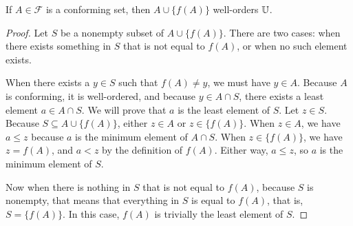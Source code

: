\documentclass[../../math.tex]{subfiles}
\begin{document}
\begin{lemma} \label{conforming_add_wo}
    If $A \in \mathcal F$ is a conforming set, then $A \cup \{f(A)\}$
    well-orders $\mathbb{U}$.
\end{lemma}
\begin{proof}
    Let $S$ be a nonempty subset of $A \cup \{f(A)\}$.  There are two cases:
    when there exists something in $S$ that is not equal to $f(A)$, or when no
    such element exists.

    When there exists a $y \in S$ such that $f(A) \neq y$, we must have $y \in
    A$.  Because $A$ is conforming, it is well-ordered, and because $y \in A
    \cap S$, there exists a least element $a \in A \cap S$.  We will prove that
    $a$ is the least element of $S$.  Let $z \in S$.  Because $S \subseteq A
    \cup \{f(A)\}$, either $z \in A$ or $z \in \{f(A)\}$.  When $z \in A$, we
    have $a \leq z$ because $a$ is the minimum element of $A \cap S$.  When $z
    \in \{f(A)\}$, we have $z = f(A)$, and $a < z$ by the definition of $f(A)$.
    Either way, $a \leq z$, so $a$ is the minimum element of $S$.

    Now when there is nothing in $S$ that is not equal to $f(A)$, because $S$ is
    nonempty, that means that everything in $S$ is equal to $f(A)$, that is, $S
    = \{f(A)\}$.  In this case, $f(A)$ is trivially the least element of $S$.
\end{proof}
\end{document}
